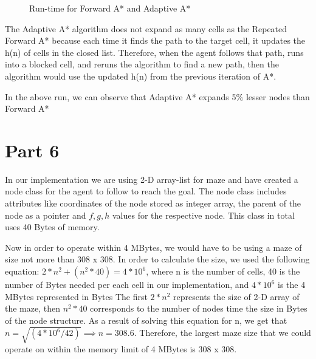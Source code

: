 \documentclass{article}
\begin{document}
\begin{figure}[!ht]
    \centering
    \caption{Run-time for Forward A* and Adaptive A*}
    \label{fig:my_label}
\end{figure}

The Adaptive A* algorithm does not expand as many cells as the Repeated Forward A* because each time it finds the path to the target cell, it updates the h(n) of cells in the closed list. Therefore, when the agent follows that path, runs into a blocked cell, and reruns the algorithm to find a new path, then the algorithm would use the updated h(n) from the previous iteration of A*.

In the above run, we can observe that Adaptive A* expands 5$\%$ lesser nodes than Forward A*
   

\section*{Part 6}

In our implementation we are using 2-D array-list for maze and have created a node class for the agent to follow to reach the goal. The node class includes attributes like coordinates of the node stored as integer array, the parent of the node as a pointer and $f, g, h$ values for the respective node. This class in total uses 40 Bytes of memory.

Now in order to operate within 4 MBytes, we would have to be using a maze of size not more than 308 x 308. In order to calculate the size, we used the following equation: $2* n^2 +(n^2 * 40) = 4 * 10^6$, where n is the number of cells, 40 is the number of Bytes needed per each cell in our implementation, and $4 * 10^6$ is the 4 MBytes represented in Bytes The first $2*n^2$ represents the size of 2-D array of the maze, then $n^2 * 40$ corresponds to the number of nodes time the size in Bytes of the node structure. As a result of solving this equation for n, we get that $n = \sqrt{(4 * 10^6 / 42)} \implies n = 308.6$. Therefore, the largest maze size that we could operate on within the memory limit of 4 MBytes is 308 x 308.
\end{document}

